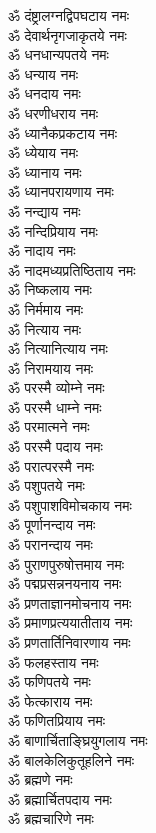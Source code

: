 \begin{multicols}{2}
\begin{flushleft}
ॐ दंष्ट्रालग्नद्विपघटाय नमः\\
ॐ देवार्थनृगजाकृतये नमः\\
ॐ धनधान्यपतये नमः\\
ॐ धन्याय नमः\\
ॐ धनदाय नमः\\
ॐ धरणीधराय नमः\\
ॐ ध्यानैकप्रकटाय नमः\hfill{}\\
ॐ ध्येयाय नमः\\
ॐ ध्यानाय नमः\\
ॐ ध्यानपरायणाय नमः\\
ॐ नन्द्याय नमः\\
ॐ नन्दिप्रियाय नमः\\
ॐ नादाय नमः\\
ॐ नादमध्यप्रतिष्ठिताय नमः\\
ॐ निष्कलाय नमः\\
ॐ निर्ममाय नमः\\
ॐ नित्याय नमः\hfill{}\\
ॐ नित्यानित्याय नमः\\
ॐ निरामयाय नमः\\
ॐ परस्मै व्योम्ने नमः\\
ॐ परस्मै धाम्ने नमः\\
ॐ परमात्मने नमः\\
ॐ परस्मै पदाय नमः\\
ॐ परात्परस्मै नमः\\
ॐ पशुपतये नमः\\
ॐ पशुपाशविमोचकाय नमः\\
ॐ पूर्णानन्दाय नमः\hfill{}\\
ॐ परानन्दाय नमः\\
ॐ पुराणपुरुषोत्तमाय नमः\\
ॐ पद्मप्रसन्ननयनाय नमः\\
ॐ प्रणताज्ञानमोचनाय नमः\\
ॐ प्रमाणप्रत्ययातीताय नमः\\
ॐ प्रणतार्तिनिवारणाय नमः\\
ॐ फलहस्ताय नमः\\
ॐ फणिपतये नमः\\
ॐ फेत्काराय नमः\\
ॐ फणितप्रियाय नमः\hfill{}\\
ॐ बाणार्चिताङ्घ्रियुगलाय नमः\\
ॐ बालकेलिकुतूहलिने नमः\\
ॐ ब्रह्मणे नमः\\
ॐ ब्रह्मार्चितपदाय नमः\\
ॐ ब्रह्मचारिणे नमः\\

\end{flushleft}
\end{multicols}
